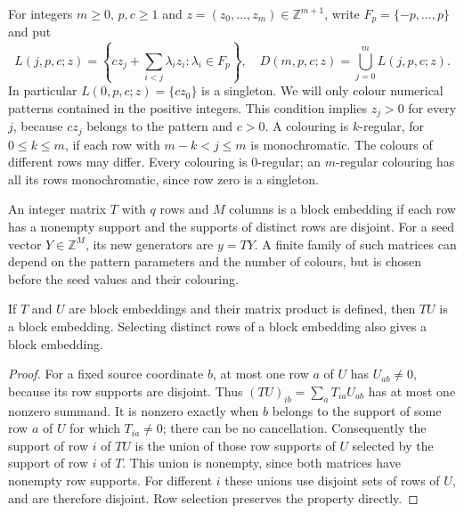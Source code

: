 \begin{definition}
\label{qr:deuber-pattern}
\leanok
For integers $m\geq0$, $p,c\geq1$ and $z=(z_0,\ldots,z_m)\in\mathbb Z^{m+1}$,
write $F_p=\{-p,\ldots,p\}$ and put
\[
 L(j,p,c;z)=\left\{cz_j+\sum_{i<j}\lambda_i z_i:
                                  \lambda_i\in F_p\right\},\quad
 D(m,p,c;z)=\bigcup_{j=0}^mL(j,p,c;z).
\]
In particular $L(0,p,c;z)=\{cz_0\}$ is a singleton.
We will only colour numerical patterns contained in the positive integers.
This condition implies $z_j>0$ for every $j$, because $cz_j$ belongs to
the pattern and $c>0$.
A colouring is $k$-regular, for $0\leq k\leq m$, if each row with
$m-k<j\leq m$ is monochromatic.  The colours of different rows may differ.
Every colouring is $0$-regular; an $m$-regular colouring has all its rows
monochromatic, since row zero is a singleton.
\end{definition}

\begin{definition}
\label{qr:block-embedding}
\leanok
An integer matrix $T$ with $q$ rows and $M$ columns is a block embedding if
each row has a nonempty support and the supports of distinct rows are
disjoint.  For a seed vector $Y\in\mathbb Z^M$, its new generators are
$y=TY$.  A finite family of such matrices can depend on the pattern
parameters and the number of colours, but is chosen before the seed
values and their colouring.
\end{definition}

\begin{lemma}
\label{qr:block-composition}
\leanok
{}
If $T$ and $U$ are block embeddings and their matrix product is defined,
then $TU$ is a block embedding.  Selecting distinct rows of a block
embedding also gives a block embedding.
\end{lemma}
\begin{proof}
For a fixed source coordinate $b$, at most one row $a$ of $U$ has
$U_{ab}\ne0$, because its row supports are disjoint.
Thus $(TU)_{ib}=\sum_aT_{ia}U_{ab}$ has at most one nonzero summand.
It is nonzero exactly when $b$ belongs to the support of some row $a$ of
$U$ for which $T_{ia}\ne0$; there can be no cancellation.
Consequently the support of row $i$ of $TU$ is the union of those row
supports of $U$ selected by the support of row $i$ of $T$.
This union is nonempty, since both matrices have nonempty row supports.
For different $i$ these unions use disjoint sets of rows of $U$, and
are therefore disjoint.  Row selection preserves the property directly.
\end{proof}

